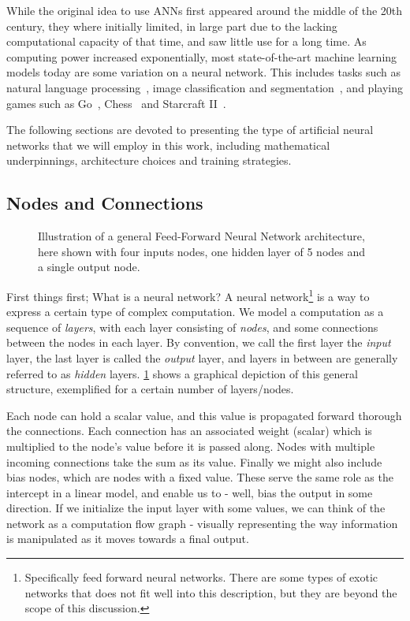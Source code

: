 \documentclass[Thesis.tex]{subfiles}
\begin{document}
While the original idea to use ANNs first appeared around the middle of the 20th
century, they where initially limited, in large part due to the lacking
computational capacity of that time, and saw little use for a long time. As
computing power increased exponentially, most state-of-the-art
machine learning models today are some variation on a neural network. This
includes tasks such as natural language processing~\cite{bert-2018}, image classification and
segmentation~\cite{gpipe-2018}, and playing games such as Go~\cite{deepmind-alpha-go-zero},
Chess~\cite{deepmind-alpha-zero} and Starcraft II~\cite{vinyals_babuschkin_chung_mathieu_2019}.

The following sections are devoted to presenting the type of artificial neural
networks that we will employ in this work, including mathematical underpinnings,
architecture choices and training strategies.

\subsection{Nodes and Connections}

\begin{figure}[h]
  \centering
  
  \caption[Illustration of an artificial neural network]{Illustration of a general Feed-Forward Neural Network architecture,
    here shown with four inputs nodes, one hidden layer of 5 nodes and a
    single output node.}
  \label{fig:neural-network-example-diagram}
\end{figure}

First things first; What is a neural network? A neural
network\footnote{Specifically feed forward neural networks. There are some types
of exotic networks that does not fit well into this description, but they are
beyond the scope of this discussion.} is a way to express a certain type of
complex computation. We model a computation as a sequence of \emph{layers}, with
each layer consisting of \emph{nodes}, and some connections between the nodes in
each layer. By convention, we call the first layer the \emph{input} layer, the
last layer is called the \emph{output} layer, and layers in between are
generally referred to as \emph{hidden} layers.
\cref{fig:neural-network-example-diagram} shows a graphical depiction of this
general structure, exemplified for a certain number of layers/nodes.

Each node can hold a scalar value, and this value is propagated forward thorough
the connections. Each connection has an associated weight (scalar) which is
multiplied to the node's value before it is passed along. Nodes with multiple
incoming connections take the sum as its value. Finally we might also include
bias nodes, which are nodes with a fixed value. These serve the same role as the
intercept in a linear model, and enable us to - well, bias the output in some
direction. If we initialize the input layer with some values, we can think of
the network as a computation flow graph - visually representing the way
information is manipulated as it moves towards a final output.
\end{document}
